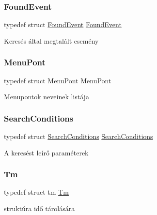 \subsubsection{\texorpdfstring{Found\+Event}{FoundEvent}}
{\footnotesize\ttfamily typedef struct \hyperlink{struct_found_event}{Found\+Event} \hyperlink{struct_found_event}{Found\+Event}}

Keresés által megtalált esemény \mbox{\label{group__structures_ga0ef80ab3e0ae7fe6915f17204e5f6211}} 
\subsubsection{\texorpdfstring{Menu\+Pont}{MenuPont}}
{\footnotesize\ttfamily typedef struct \hyperlink{struct_menu_pont}{Menu\+Pont}  \hyperlink{struct_menu_pont}{Menu\+Pont}}

Menupontok neveinek listája \mbox{\label{group__structures_gadc5706147428e7cb68faa6fb19085d7a}} 
\subsubsection{\texorpdfstring{Search\+Conditions}{SearchConditions}}
{\footnotesize\ttfamily typedef struct \hyperlink{struct_search_conditions}{Search\+Conditions} \hyperlink{struct_search_conditions}{Search\+Conditions}}

A keresést leírő paraméterek \mbox{\label{group__structures_gaffc453d30a4a6ce81ed778fd04d2d256}} 
\subsubsection{\texorpdfstring{Tm}{Tm}}
{\footnotesize\ttfamily typedef struct tm \hyperlink{group__list_gaffc453d30a4a6ce81ed778fd04d2d256}{Tm}}

struktúra idő tárolására 